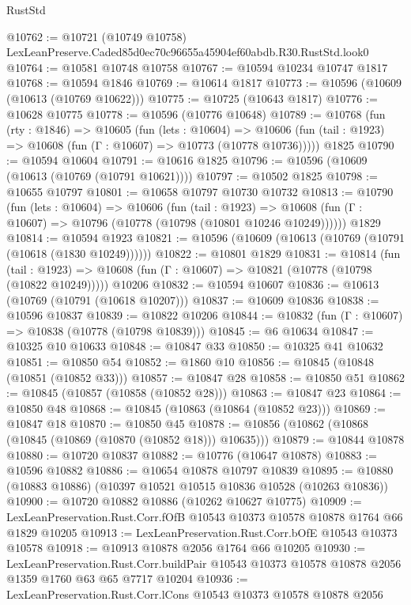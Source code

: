 \begin{lexlean}{RustStd}
\begin{coremodule}
@10762 := @10721 (@10749 @10758) LexLeanPreserve.Caded85d0ec70c96655a45904ef60abdb.R30.RustStd.look0
@10764 := @10581 @10748 @10758
@10767 := @10594 @10234 @10747 @1817
@10768 := @10594 @1846
@10769 := @10614 @1817
@10773 := @10596 (@10609 (@10613 (@10769 @10622)))
@10775 := @10725 (@10643 @1817)
@10776 := @10628 @10775
@10778 := @10596 (@10776 @10648)
@10789 := @10768
    (fun (rty : @1846) =>
    @10605
      (fun (lets : @10604) =>
      @10606 (fun (tail : @1923) => @10608 (fun (Γ : @10607) => @10773 (@10778 @10736)))))
    @1825
@10790 := @10594 @10604
@10791 := @10616 @1825
@10796 := @10596 (@10609 (@10613 (@10769 (@10791 @10621))))
@10797 := @10502 @1825
@10798 := @10655 @10797
@10801 := @10658 @10797 @10730 @10732
@10813 := @10790
    (fun (lets : @10604) =>
    @10606
      (fun (tail : @1923) =>
      @10608 (fun (Γ : @10607) => @10796 (@10778 (@10798 (@10801 @10246 @10249))))))
    @1829
@10814 := @10594 @1923
@10821 := @10596 (@10609 (@10613 (@10769 (@10791 (@10618 (@1830 @10249))))))
@10822 := @10801 @1829
@10831 := @10814
    (fun (tail : @1923) => @10608 (fun (Γ : @10607) => @10821 (@10778 (@10798 (@10822 @10249)))))
    @10206
@10832 := @10594 @10607
@10836 := @10613 (@10769 (@10791 (@10618 @10207)))
@10837 := @10609 @10836
@10838 := @10596 @10837
@10839 := @10822 @10206
@10844 := @10832 (fun (Γ : @10607) => @10838 (@10778 (@10798 @10839)))
@10845 := @6 @10634
@10847 := @10325 @10 @10633
@10848 := @10847 @33
@10850 := @10325 @41 @10632
@10851 := @10850 @54
@10852 := @1860 @10
@10856 := @10845 (@10848 (@10851 (@10852 @33)))
@10857 := @10847 @28
@10858 := @10850 @51
@10862 := @10845 (@10857 (@10858 (@10852 @28)))
@10863 := @10847 @23
@10864 := @10850 @48
@10868 := @10845 (@10863 (@10864 (@10852 @23)))
@10869 := @10847 @18
@10870 := @10850 @45
@10878 := @10856 (@10862 (@10868 (@10845 (@10869 (@10870 (@10852 @18))) @10635)))
@10879 := @10844 @10878
@10880 := @10720 @10837
@10882 := @10776 (@10647 @10878)
@10883 := @10596 @10882
@10886 := @10654 @10878 @10797 @10839
@10895 := @10880 (@10883 @10886) (@10397 @10521 @10515 @10836 @10528 (@10263 @10836))
@10900 := @10720 @10882 @10886 (@10262 @10627 @10775)
@10909 := LexLeanPreservation.Rust.Corr.fOfB @10543 @10373 @10578 @10878 @1764 @66 @1829 @10205
@10913 := LexLeanPreservation.Rust.Corr.bOfE @10543 @10373 @10578
@10918 := @10913 @10878 @2056 @1764 @66 @10205
@10930 := LexLeanPreservation.Rust.Corr.buildPair
    @10543
    @10373
    @10578
    @10878
    @2056
    @1359
    @1760
    @63
    @65
    @7717
    @10204
@10936 := LexLeanPreservation.Rust.Corr.lCons @10543 @10373 @10578 @10878 @2056

\end{coremodule}
\end{lexlean}
